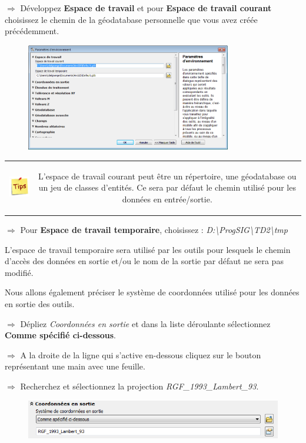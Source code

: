 \documentclass[11pt]{article}
\newcommand{\action}{$\Rightarrow$ }
\newenvironment{note}{%
	\begin{tabular}[t t]{c c}
		\includegraphics{img/tips.png}
		 &
		\begin{minipage}[c]{0.9\linewidth}
			\begin{sffamily}
}{%
			\end{sffamily}
		\end{minipage}
	\end{tabular}
}
\begin{document}
\action Développez \textbf{Espace de travail} et pour \textbf{Espace de travail courant} choisissez le chemin de la géodatabase personnelle que vous avez créée précédemment.
\begin{figure}[H]
	\center \includegraphics[width=0.8\textwidth]{img/td3/environnements_espace_travail.png}\\
\end{figure}

\begin{note}
L'espace de travail courant peut être un répertoire, une géodatabase ou un jeu de classes d'entités. Ce sera par défaut le chemin utilisé pour les données en entrée/sortie.
\end{note}

\action Pour \textbf{Espace de travail temporaire}, choisissez : \textit{D:\textbackslash{}ProgSIG\textbackslash{}TD2\textbackslash{}tmp}

L'espace de travail temporaire sera utilisé par les outils pour lesquels le chemin d'accès des données en sortie et/ou le nom de la sortie par défaut ne sera pas modifié.

Nous allons également préciser le système de coordonnées utilisé pour les données en sortie des outils.

\action Dépliez \textit{Coordonnées en sortie} et dans la liste déroulante sélectionnez \textbf{Comme spécifié ci-dessous}.

\action A la droite de la ligne qui s'active en-dessous cliquez sur le bouton représentant une main avec une feuille.

\action Recherchez et sélectionnez la projection \textit{RGF\_1993\_Lambert\_93}.
\begin{figure}[H]
	\center \includegraphics{img/td3/environnements_coordonnees.png}\\
\end{figure}
\end{document}

